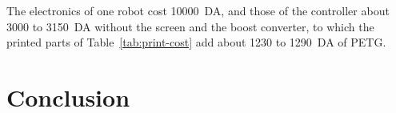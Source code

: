 The electronics of one robot cost 10000~DA, and those of the controller about 3000 to
3150~DA without the screen and the boost converter, to which the printed parts of Table~\ref{tab:print-cost} add about 1230 to 1290~DA
of PETG.

\section{Conclusion}
